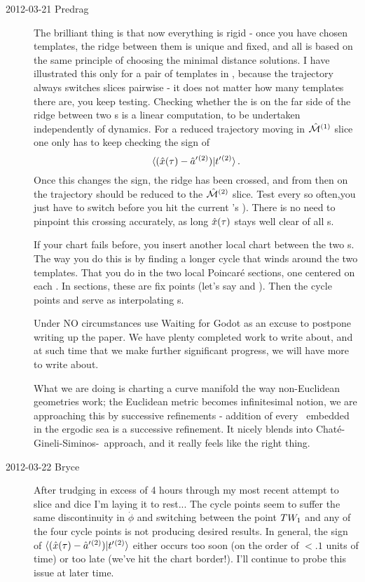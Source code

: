\begin{description}
\item[2012-03-21 Predrag~~]
The brilliant thing is that now everything is rigid - once you have
chosen templates, the ridge between them is unique and fixed, and all is
based on the same principle of choosing the minimal distance solutions. I
have illustrated this only for a pair of templates in
, because the trajectory always switches slices
pairwise - it does not matter how many templates there are, you keep
testing. Checking whether the {\chartBord} is on the far side of
the ridge between two \slice s is a linear computation, to be undertaken
independently of dynamics. For a reduced trajectory moving in
$\hat{\cal M}{}^{(1)}$ slice one only has to keep checking the sign of
\[
\braket{(\sspRed(\zeit)- \slicep{}^{(2)})}{\sliceTan{}{}^{(2)}}
\,.
\]
Once this changes the sign, the ridge has been crossed, and from then on
the trajectory should be reduced to the $\hat{\cal M}{}^{(2)}$ slice. Test
every so often,you just have to switch before you hit the current
\template's {\chartBord}). There is no need to pinpoint this crossing
accurately, as long $\hat{x}(\tau)$ stays well clear of all \chartBord
s.

If your chart fails before, you insert another local chart between the
two \template s. The way you do this is by finding a longer cycle that
winds around the two templates. That you do in the two local Poincar\'e
sections, one centered on each \template. In sections, these are fix
points (let's say  and ). Then the cycle points
 and   serve as interpolating \template s.

Under {\color{red} NO circumstances} use
 {Waiting
for Godot} as an excuse to postpone writing up the paper. We have plenty
completed work to write about, and at such time that we make further
significant progress, we will have more to write about.

What we are doing is charting a curve manifold the way non-Euclidean
geometries work; the Euclidean metric becomes infinitesimal notion, we
are approaching this by successive refinements - addition of every \po\
embedded in the ergodic sea is a successive refinement. It nicely blends
into Chat\'e-Gineli-Siminos-\etal\ approach, and it really feels like the
right thing.

\item[2012-03-22 Bryce]
After trudging in excess of 4 hours through my most recent attempt to
slice and dice I'm laying it to rest... The cycle points seem to suffer
the same discontinuity in $\dot{\phi}$ and switching between the
{\reqv} point $TW_{1}$ and any of the four cycle points is not
producing desired results. In general, the sign of
$\langle(\hat{x}(\tau)- \hat{a}'{}^{(2)})|t'_{}{}^{(2)}\rangle$
either occurs too soon (on the order of $<.1$ units of time)  or too late
(we've hit the chart border!). I'll continue to probe this issue at later
time.



\end{description}
